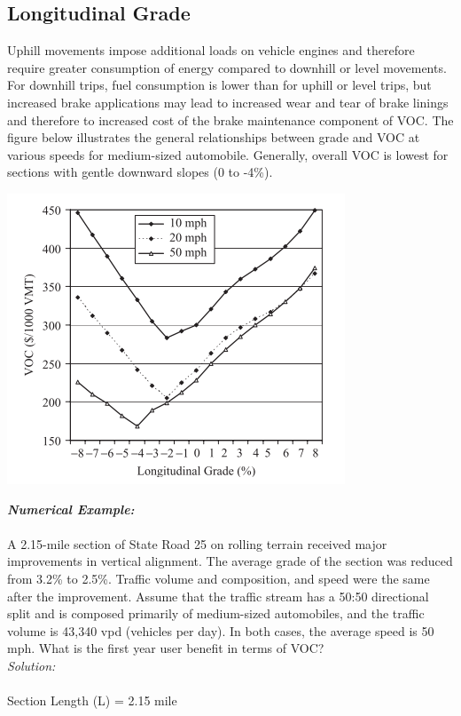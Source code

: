 \subsection{Longitudinal Grade} 
Uphill movements impose additional loads on vehicle engines and therefore require greater consumption of energy compared to downhill or level movements. For downhill trips, fuel consumption is lower than for uphill or level trips, but increased brake applications may lead to increased wear and tear of brake linings and therefore to increased cost of the brake maintenance component of VOC. The figure below illustrates the general relationships between grade and VOC at various speeds for medium-sized automobile. Generally, overall VOC is lowest for sections with gentle downward slopes (0 to -4\%).
\begin{center}
	\includegraphics[scale=0.7]{gfx/fig66.png}
\end{center}
\textbf{\textit{Numerical Example:}}\\\\
A 2.15-mile section of State Road 25 on rolling terrain received major improvements in vertical alignment. The average grade of the section was reduced from 3.2\% to 2.5\%. Traffic volume and composition, and speed were the same after the improvement. Assume that the traffic stream has a 50:50 directional split and is composed primarily of medium-sized automobiles, and the traffic volume is 43,340 vpd (vehicles per day). In both cases, the average speed is 50 mph. What is the first year user benefit in terms of VOC?\\
\textit{Solution:}\\\\
Section Length (L) = 2.15 mile\\
